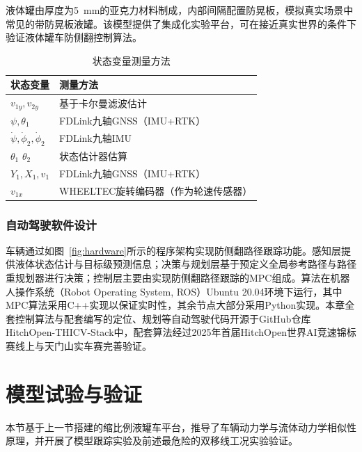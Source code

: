             液体罐由厚度为\SI{5}{mm}的亚克力材料制成，内部间隔配置防晃板，模拟真实场景中常见的带防晃板液罐\cite{wanying2020antirolover}。该模型提供了集成化实验平台，可在接近真实世界的条件下验证液体罐车防侧翻控制算法。

            \begin{table}[htbp]
            \centering
            \caption{状态变量测量方法}
            \label{tab:state_measurement}
            \begin{tabular}{ll}
                \toprule
                状态变量 & 测量方法 \\
                \midrule
                \(v_{1y}, v_{2y}\) & 基于卡尔曼滤波估计\cite{FengRan2018} \\
                \(\psi, \theta_1\) & FDLink九轴GNSS（IMU+RTK） \\
                \(\dot{\psi}, \dot{\phi}_2, \dot{\phi}_2\) & FDLink九轴IMU \\
                \(\theta_1\) \(\theta_2\) & 状态估计器估算 \\
                \(Y_1, X_1, v_1\) & FDLink九轴GNSS（IMU+RTK） \\
                \(v_{1x}\) & WHEELTEC旋转编码器（作为轮速传感器） \\
                \bottomrule
            \end{tabular}
            \end{table}


        \subsubsection{自动驾驶软件设计}
            \label{subsub:software}
            车辆通过如图~\ref{fig:hardware}所示的程序架构实现防侧翻路径跟踪功能。感知层提供液体状态估计与目标级预测信息；决策与规划层基于预定义全局参考路径与路径重规划器进行决策；控制层主要由实现防侧翻路径跟踪的MPC组成。算法在机器人操作系统（Robot Operating System, ROS）Ubuntu 20.04环境下运行，其中MPC算法采用C++实现以保证实时性，其余节点大部分采用Python实现。本章全套控制算法与配套编写的定位、规划等自动驾驶代码开源于GitHub仓库HitchOpen-THICV-Stack中\cite{KomasaQi2025HitchOpen-THICV-Stack_repo}，配套算法经过2025年首届HitchOpen世界AI竞速锦标赛线上与天门山实车赛完善验证。


\section{模型试验与验证}
    \label{sub:model_experiment}
    本节基于上一节搭建的缩比例液罐车平台，推导了车辆动力学与流体动力学相似性原理，并开展了模型跟踪实验及前述最危险的双移线工况实验验证。

